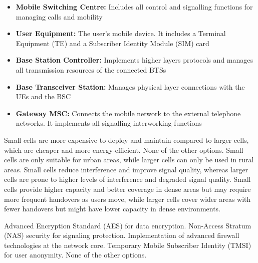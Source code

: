 \begin{solution}
    \begin{itemize}
        \item \textbf{Mobile Switching Centre:} Includes all control and signalling functions for managing calls and mobility
        \item \textbf{User Equipment:} The user's mobile device. It includes a Terminal Equipment (TE) and a Subscriber Identity Module (SIM) card
        \item \textbf{Base Station Controller:} Implements higher layers protocols and manages all transmission resources of the connected BTSs
        \item \textbf{Base Transceiver Station:} Manages physical layer connections with the UEs and the BSC
        \item \textbf{Gateway MSC:} Connects the mobile network to the external telephone networks. It implements all signalling interworking functions 
    \end{itemize}
\end{solution}

\begin{checkboxes}
    \choice Small cells are more expensive to deploy and maintain compared to larger cells, which are cheaper and more energy-efficient.
    \choice None of the other options.
    \choice Small cells are only suitable for urban areas, while larger cells can only be used in rural areas.
    \choice Small cells reduce interference and improve signal quality, whereas larger cells are prone to higher levels of interference and degraded signal quality.
    \CorrectChoice Small cells provide higher capacity and better coverage in dense areas but may require more frequent handovers as users move, while larger cells cover wider areas with fewer handovers but might have lower capacity in dense environments.
\end{checkboxes}

\begin{checkboxes}
    \CorrectChoice Advanced Encryption Standard (AES) for data encryption.
    \CorrectChoice Non-Access Stratum (NAS) security for signaling protection.
    \choice Implementation of advanced firewall technologies at the network core.
    \choice Temporary Mobile Subscriber Identity (TMSI) for user anonymity.
    \choice None of the other options.
\end{checkboxes}

